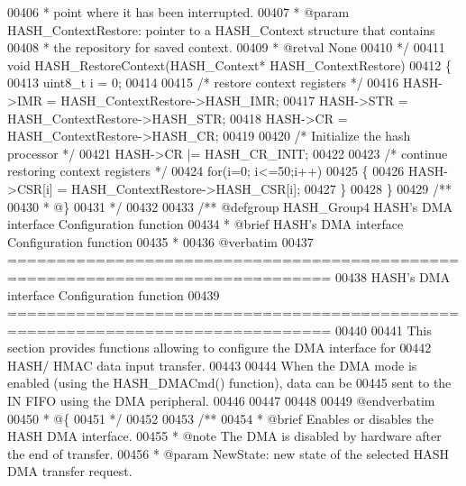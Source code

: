 \begin{DoxyCode}
00406 \textcolor{comment}{  *         point where it has been interrupted.  }
00407 \textcolor{comment}{  * @param  HASH\_ContextRestore: pointer to a HASH\_Context structure that contains}
00408 \textcolor{comment}{  *         the repository for saved context.}
00409 \textcolor{comment}{  * @retval None}
00410 \textcolor{comment}{  */}
00411 \textcolor{keywordtype}{void} HASH_RestoreContext(HASH\_Context* HASH\_ContextRestore)
00412 \{
00413   uint8\_t i = 0;
00414 
00415   \textcolor{comment}{/* restore context registers */}
00416   HASH->IMR = HASH\_ContextRestore->HASH\_IMR;
00417   HASH->STR = HASH\_ContextRestore->HASH\_STR;
00418   HASH->CR = HASH\_ContextRestore->HASH\_CR;
00419 
00420   \textcolor{comment}{/* Initialize the hash processor */}
00421   HASH->CR |= HASH_CR_INIT;
00422 
00423    \textcolor{comment}{/* continue restoring context registers */}
00424   \textcolor{keywordflow}{for}(i=0; i<=50;i++)
00425   \{
00426      HASH->CSR[i] = HASH\_ContextRestore->HASH\_CSR[i];
00427   \}
00428 \}
00429 \textcolor{comment}{/**}
00430 \textcolor{comment}{  * @\}}
00431 \textcolor{comment}{  */}
00432 
00433 \textcolor{comment}{/** @defgroup HASH\_Group4 HASH's DMA interface Configuration function}
00434 \textcolor{comment}{ *  @brief   HASH's DMA interface Configuration function }
00435 \textcolor{comment}{ *}
00436 \textcolor{comment}{@verbatim   }
00437 \textcolor{comment}{ ===============================================================================}
00438 \textcolor{comment}{                   HASH's DMA interface Configuration function}
00439 \textcolor{comment}{ ===============================================================================  }
00440 \textcolor{comment}{}
00441 \textcolor{comment}{  This section provides functions allowing to configure the DMA interface for }
00442 \textcolor{comment}{  HASH/ HMAC data input transfer.}
00443 \textcolor{comment}{   }
00444 \textcolor{comment}{  When the DMA mode is enabled (using the HASH\_DMACmd() function), data can be }
00445 \textcolor{comment}{  sent to the IN FIFO using the DMA peripheral.}
00446 \textcolor{comment}{}
00447 \textcolor{comment}{}
00448 \textcolor{comment}{}
00449 \textcolor{comment}{@endverbatim}
00450 \textcolor{comment}{  * @\{}
00451 \textcolor{comment}{  */}
00452 
00453 \textcolor{comment}{/**}
00454 \textcolor{comment}{  * @brief  Enables or disables the HASH DMA interface.}
00455 \textcolor{comment}{  * @note   The DMA is disabled by hardware after the end of transfer.}
00456 \textcolor{comment}{  * @param  NewState: new state of the selected HASH DMA transfer request.}

\end{DoxyCode}
